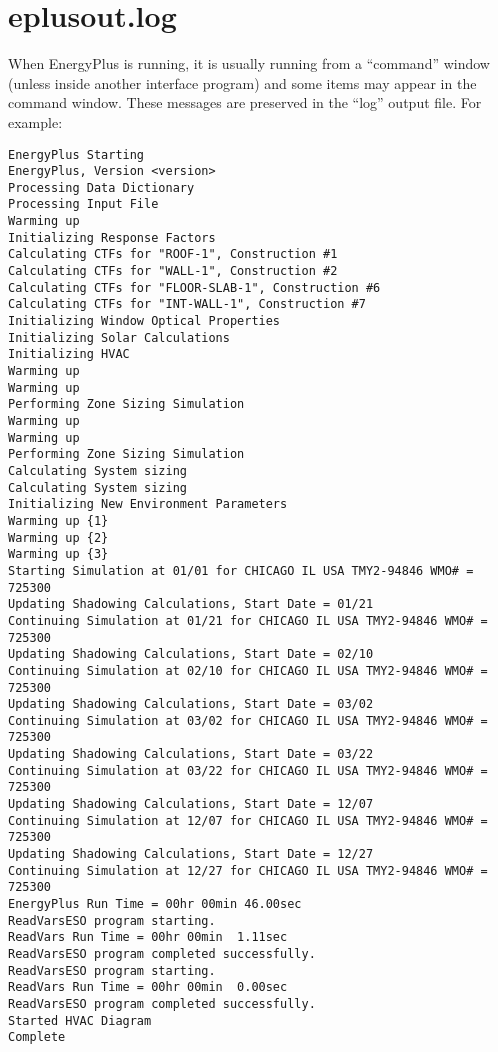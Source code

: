\section{eplusout.log}

When EnergyPlus is running, it is usually running from a “command” window (unless inside another interface program) and some items may appear in the command window. These messages are preserved in the “log” output file. For example:

\begin{lstlisting}
EnergyPlus Starting
EnergyPlus, Version <version>
Processing Data Dictionary
Processing Input File
Warming up
Initializing Response Factors
Calculating CTFs for "ROOF-1", Construction #1
Calculating CTFs for "WALL-1", Construction #2
Calculating CTFs for "FLOOR-SLAB-1", Construction #6
Calculating CTFs for "INT-WALL-1", Construction #7
Initializing Window Optical Properties
Initializing Solar Calculations
Initializing HVAC
Warming up
Warming up
Performing Zone Sizing Simulation
Warming up
Warming up
Performing Zone Sizing Simulation
Calculating System sizing
Calculating System sizing
Initializing New Environment Parameters
Warming up {1}
Warming up {2}
Warming up {3}
Starting Simulation at 01/01 for CHICAGO IL USA TMY2-94846 WMO# = 725300
Updating Shadowing Calculations, Start Date = 01/21
Continuing Simulation at 01/21 for CHICAGO IL USA TMY2-94846 WMO# = 725300
Updating Shadowing Calculations, Start Date = 02/10
Continuing Simulation at 02/10 for CHICAGO IL USA TMY2-94846 WMO# = 725300
Updating Shadowing Calculations, Start Date = 03/02
Continuing Simulation at 03/02 for CHICAGO IL USA TMY2-94846 WMO# = 725300
Updating Shadowing Calculations, Start Date = 03/22
Continuing Simulation at 03/22 for CHICAGO IL USA TMY2-94846 WMO# = 725300
Updating Shadowing Calculations, Start Date = 12/07
Continuing Simulation at 12/07 for CHICAGO IL USA TMY2-94846 WMO# = 725300
Updating Shadowing Calculations, Start Date = 12/27
Continuing Simulation at 12/27 for CHICAGO IL USA TMY2-94846 WMO# = 725300
EnergyPlus Run Time = 00hr 00min 46.00sec
ReadVarsESO program starting.
ReadVars Run Time = 00hr 00min  1.11sec
ReadVarsESO program completed successfully.
ReadVarsESO program starting.
ReadVars Run Time = 00hr 00min  0.00sec
ReadVarsESO program completed successfully.
Started HVAC Diagram
Complete
\end{lstlisting}
